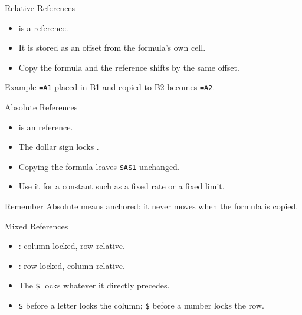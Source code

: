 \documentclass[aspectratio=169]{beamer}
\begin{document}
\begin{frame}{Relative References}
  \begin{itemize}
    \item {} is a  reference.
    \item It is stored as an offset from the formula's own cell.
    \item Copy the formula and the reference shifts by the same offset.
  \end{itemize}
  \begin{exampleblock}{Example}
    \texttt{=A1} placed in B1 and copied to B2 becomes \texttt{=A2}.
  \end{exampleblock}
\end{frame}

\begin{frame}{Absolute References}
  \begin{itemize}
    \item {} is an  reference.
    \item The dollar sign locks .
    \item Copying the formula leaves \texttt{\$A\$1} unchanged.
    \item Use it for a constant such as a fixed rate or a fixed limit.
  \end{itemize}
  \begin{block}{Remember}
    Absolute means anchored: it never moves when the formula is copied.
  \end{block}
\end{frame}

\begin{frame}{Mixed References}
  \begin{itemize}
    \item {}: column locked, row relative.
    \item {}: row locked, column relative.
    \item The \texttt{\$} locks whatever it directly precedes.
    \item \texttt{\$} before a letter locks the column; \texttt{\$} before a
      number locks the row.
  \end{itemize}
\end{frame}
\end{document}
